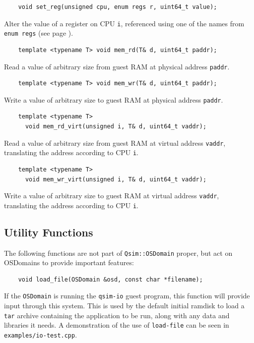 \documentclass[letterpaper, 10pt]{book}
\begin{document}
\label{func:set_reg} \begin{verbatim}
    void set_reg(unsigned cpu, enum regs r, uint64_t value);
\end{verbatim}
Alter the value of a register on CPU \texttt{i}, referenced using one of the
names from \texttt{enum regs} (see page \pageref{enum:regs}).

\label{tf:mem_rd} \begin{verbatim}
    template <typename T> void mem_rd(T& d, uint64_t paddr);
\end{verbatim}
Read a value of arbitrary size from guest RAM at physical address 
\texttt{paddr}.

\label{tf:mem_wr} \begin{verbatim}
    template <typename T> void mem_wr(T& d, uint64_t paddr);
\end{verbatim}
Write a value of arbitrary size to guest RAM at physical address
\texttt{paddr}.

\label{tf:mem_rd_virt} \begin{verbatim}
    template <typename T> 
      void mem_rd_virt(unsigned i, T& d, uint64_t vaddr);
\end{verbatim}
Read a value of arbitrary size from guest RAM at virtual address
\texttt{vaddr}, translating the address according to CPU \texttt{i}.

\label{tf:mem_wr_virt} \begin{verbatim}
    template <typename T> 
      void mem_wr_virt(unsigned i, T& d, uint64_t vaddr);
\end{verbatim}

Write a value of arbitrary size to guest RAM at virtual address
\texttt{vaddr}, translating the address according to CPU \texttt{i}.

\subsection{Utility Functions}

The following functions are not part of \texttt{Qsim::OSDomain} proper, but act on OSDomains to provide important features:

\label{func:load_file} \begin{verbatim}
    void load_file(OSDomain &osd, const char *filename);
\end{verbatim}

If the \texttt{OSDomain} is running the \texttt{qsim-io} guest program, this
function will provide input through this system. This is used by the default
initial ramdisk to load a \texttt{tar} archive containing the application to be
run, along with any data and libraries it needs. A demonstration of the use of
\texttt{load-file} can be seen in \texttt{examples/io-test.cpp}.
\newpage
\end{document}
